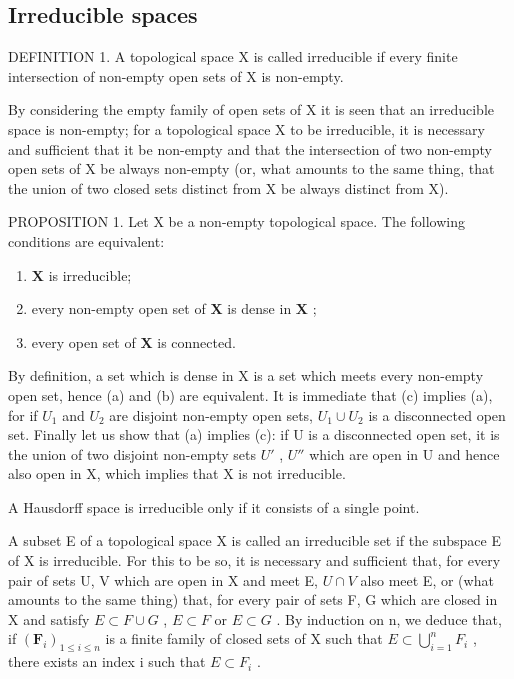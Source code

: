 \subsection{Irreducible spaces}

DEFINITION 1. A topological space X is called irreducible if every finite intersection of non-empty open sets of X is non-empty.

By considering the empty family of open sets of X it is seen that an irreducible space is non-empty; for a topological space X to be irreducible, it is necessary and sufficient that it be non-empty and that the intersection of two non-empty open sets of X be always non-empty (or, what amounts to the same thing, that the union of two closed sets distinct from X be always distinct from X).

PROPOSITION 1. Let X be a non-empty topological space. The following conditions are equivalent:

\begin{enumerate}
\def\labelenumi{(\alph{enumi})}
\item
  \(\mathbf{X}\) is irreducible;
\item
  every non-empty open set of \(\mathbf{X}\) is dense in \(\mathbf{X}\) ;
\item
  every open set of \(\mathbf{X}\) is connected.
\end{enumerate}

By definition, a set which is dense in X is a set which meets every non-empty open set, hence (a) and (b) are equivalent. It is immediate that (c) implies (a), for if \(U_{1}\) and \(U_{2}\) are disjoint non-empty open sets, \(U_{1} \cup U_{2}\) is a disconnected open set. Finally let us show that (a) implies (c): if U is a disconnected open set, it is the union of two disjoint non-empty sets \(U'\) , \(U''\) which are open in U and hence also open in X, which implies that X is not irreducible.

A Hausdorff space is irreducible only if it consists of a single point.

A subset E of a topological space X is called an irreducible set if the subspace E of X is irreducible. For this to be so, it is necessary and sufficient that, for every pair of sets U, V which are open in X and meet E, \(U \cap V\) also meet E, or (what amounts to the same thing) that, for every pair of sets F, G which are closed in X and satisfy \(E \subset F \cup G\) , \(E \subset F\) or \(E \subset G\) . By induction on n, we deduce that, if \((\mathbf{F}_{i})_{1 \leq i \leq n}\) is a finite family of closed sets of X such that \(E \subset \bigcup_{i=1}^{n} F_{i}\) , there exists an index i such that \(E \subset F_{i}\) .

